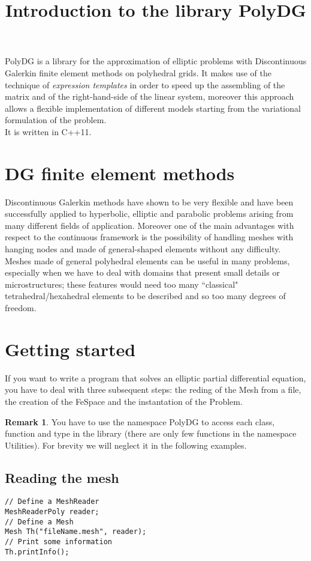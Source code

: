 \documentclass[12pt, a4paper]{article}
\title{\textbf{Introduction to the library PolyDG}}
\newcommand{\code}[1]{{\footnotesize\ttfamily #1}}
\theoremstyle{definition}
\newtheorem*{remark}{Remark}
\begin{document}
\maketitle

PolyDG is a library for the approximation of elliptic problems with 
Discontinuous Galerkin finite element methods on polyhedral grids.
It makes use of the technique of \emph{expression templates} in order to speed 
up the assembling of the matrix and of the right-hand-side of the linear 
system, moreover this approach allows a flexible implementation of different 
models starting from the variational formulation of the problem.\\
It is written in C++11.

\section{DG finite element methods}
Discontinuous Galerkin methods have shown to be very flexible and have been
successfully applied to hyperbolic, elliptic and parabolic problems arising 
from many different fields of application. Moreover one of the main advantages 
with respect to the continuous framework is the possibility of handling meshes 
with hanging nodes and made of general-shaped elements without any difficulty.\\
Meshes made of general polyhedral elements can be useful in many problems, 
especially when	we have to deal with domains that present small details or 
microstructures; these features would need too many  ``classical" 
tetrahedral/hexahedral elements to be described and so too many degrees of 
freedom.

\section{Getting started}
If you want to write a program that solves an elliptic partial differential
equation, you have to deal with three subsequent steps: the reding of the 
\code{Mesh} from a file, the creation of the \code{FeSpace} and the 
instantation of the \code{Problem}.

\begin{remark}
	You have to use the namespace \code{PolyDG} to access each class, function 
	and	type in the library (there are only few functions in the namespace 
	Utilities). For brevity we will neglect it in the following examples.
\end{remark}

\subsection{Reading the mesh}
\begin{lstlisting}
// Define a MeshReader
MeshReaderPoly reader;
// Define a Mesh
Mesh Th("fileName.mesh", reader);
// Print some information
Th.printInfo();
\end{lstlisting}
\end{document}
